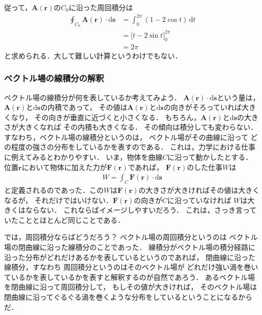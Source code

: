 従って，$\bm{A}(\bm{r})$の$C_0$に沿った周回積分は
\begin{align*}
\oint_{C_0} \bm{A} (\bm{r} ) \cdot \mathrm{d} \bm{s} & 
= \int_0^{2 \pi} (1- 2 \cos t) \, \mathrm{d} t \\
& = \biggl[ t - 2 \sin t \biggr]_0^{2 \pi} \\
& = 2 \pi  
\end{align*}
と求められる．大して難しい計算というわけでもない．
\subsubsection{ベクトル場の線積分の解釈}
ベクトル場の線積分が何を表しているか考えてみよう．
$\bm{A} ( \bm{r} ) \cdot \mathrm{d} \bm{s}$という量は，
$\bm{A}(\bm{r} )$と$\mathrm{d} \bm{s}$の内積であって，
その値は$\bm{A}(\bm{r} )$と$\mathrm{d} \bm{s}$の向きがそろっていれば大きくなり，
その向きが垂直に近づくと小さくなる．
もちろん，$\bm{A}(\bm{r} )$と$\mathrm{d} \bm{s}$の大きさが大きくなれば
その内積も大きくなる．
その傾向は積分しても変わらない．
すなわち，ベクトル場の線積分というのは，
ベクトル場がその曲線に沿って
どの程度の強さの分布をしているかを表すのである．
これは，力学における仕事に例えてみるとわかりやすい．
いま，物体を曲線$C$に沿って動かしたとする．
位置$\bm{r}$において物体に加えた力が$\bm{F}(\bm{r})$であれば，
$\bm{F}(\bm{r})$のした仕事$W$は
\begin{align}
W = \int_C \bm{F}(\bm{r}) \cdot \mathrm{d} \bm{s}
\label{eq:work}
\end{align}
と定義されるのであった．この$W$は$\bm{F}(\bm{r})$の大きさが大きければその値は大きくなるが，
それだけではいけない．$\bm{F}(\bm{r})$の向きが$C$に沿っていなければ
$W$は大きくはならない．
これならばイメージしやすいだろう．
これは，さっき言っていたこととほとんど同じことである．

では，周回積分ならばどうだろう？ ベクトル場の周回積分というのは
ベクトル場の閉曲線に沿った線積分のことであった．
線積分がベクトル場の積分経路に沿った分布がどれだけあるかを表しているというのであれば，
閉曲線に沿った線積分，すなわち
周回積分というのはそのベクトル場が
どれだけ強い渦を巻いているかを表しているかを表すと解釈するのが自然であろう．
あるベクトル場を閉曲線に沿って周回積分して，
もしその値が大きければ，
そのベクトル場は閉曲線に沿ってぐるぐる渦を巻くような分布をしているということになるからだ．

